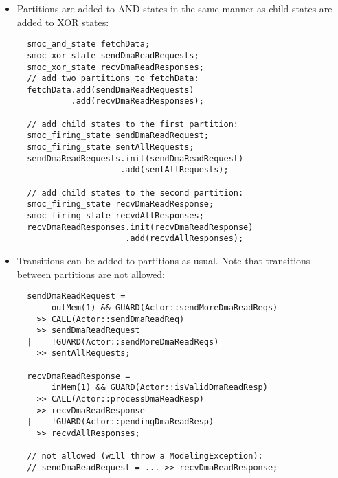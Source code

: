 \begin{frame}[fragile=singleslide]
\begin{itemize}
\item Partitions are added to AND states in the same manner as child states are added to XOR states:
\begin{lstlisting}
  smoc_and_state fetchData;
  smoc_xor_state sendDmaReadRequests;
  smoc_xor_state recvDmaReadResponses;
  // add two partitions to fetchData:
  fetchData.add(sendDmaReadRequests)
           .add(recvDmaReadResponses);

  // add child states to the first partition:
  smoc_firing_state sendDmaReadRequest; 
  smoc_firing_state sentAllRequests; 
  sendDmaReadRequests.init(sendDmaReadRequest)
                     .add(sentAllRequests);

  // add child states to the second partition:
  smoc_firing_state recvDmaReadResponse; 
  smoc_firing_state recvdAllResponses; 
  recvDmaReadResponses.init(recvDmaReadResponse)
                      .add(recvdAllResponses);
\end{lstlisting}
\end{itemize}
\end{frame}

\begin{frame}[fragile=singleslide]
\begin{itemize}
\item Transitions can be added to partitions as usual. Note that transitions between partitions are not allowed:
\begin{lstlisting}
  sendDmaReadRequest =
       outMem(1) && GUARD(Actor::sendMoreDmaReadReqs)
    >> CALL(Actor::sendDmaReadReq)
    >> sendDmaReadRequest
  |    !GUARD(Actor::sendMoreDmaReadReqs)
    >> sentAllRequests;
  
  recvDmaReadResponse =
       inMem(1) && GUARD(Actor::isValidDmaReadResp)
    >> CALL(Actor::processDmaReadResp)
    >> recvDmaReadResponse
  |    !GUARD(Actor::pendingDmaReadResp)
    >> recvdAllResponses;

  // not allowed (will throw a ModelingException):
  // sendDmaReadRequest = ... >> recvDmaReadResponse;
\end{lstlisting}
\end{itemize}
\end{frame}

